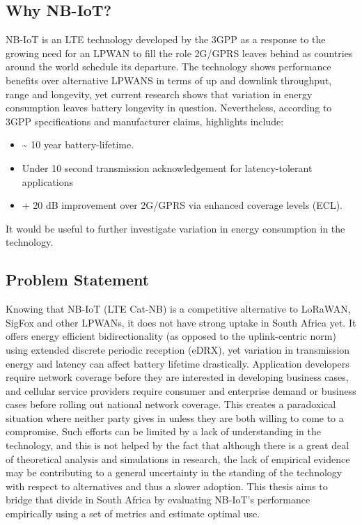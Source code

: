 \documentclass[]{article}
\providecommand{\tightlist}{%
  \setlength{\itemsep}{0pt}\setlength{\parskip}{0pt}}
\begin{document}
\hypertarget{why}{%
\subsection{Why NB-IoT?}\label{why}}

NB-IoT is an LTE technology developed by the 3GPP as a response to the
growing need for an LPWAN to fill the role 2G/GPRS leaves behind as
countries around the world schedule its departure. The technology shows
performance benefits over alternative LPWANS in terms of up and downlink
throughput, range and longevity, yet current research shows that
variation in energy consumption leaves battery longevity in question.
Nevertheless, according to 3GPP specifications and manufacturer claims,
highlights include:

\begin{itemize}
\tightlist
\item
  \textasciitilde{} 10 year battery-lifetime.
\item
  Under 10 second transmission acknowledgement for latency-tolerant
  applications
\item
  + 20 dB improvement over 2G/GPRS via enhanced coverage levels (ECL).
\end{itemize}

It would be useful to further investigate variation in energy
consumption in the technology.

\hypertarget{probstat}{%
\subsection{Problem Statement}\label{probstat}}

Knowing that NB-IoT (LTE Cat-NB) is a competitive alternative to
LoRaWAN, SigFox and other LPWANs, it does not have strong uptake in
South Africa yet. It offers energy efficient bidirectionality (as
opposed to the uplink-centric norm) using extended discrete periodic
reception (eDRX), yet variation in transmission energy and latency can
affect battery lifetime drastically. Application developers require
network coverage before they are interested in developing business
cases, and cellular service providers require consumer and enterprise
demand or business cases before rolling out national network coverage.
This creates a paradoxical situation where neither party gives in unless
they are both willing to come to a compromise. Such efforts can be
limited by a lack of understanding in the technology, and this is not
helped by the fact that although there is a great deal of theoretical
analysis and simulations in research, the lack of empirical evidence may
be contributing to a general uncertainty in the standing of the
technology with respect to alternatives and thus a slower adoption. This
thesis aims to bridge that divide in South Africa by evaluating NB-IoT's
performance empirically using a set of metrics and estimate optimal use.
\end{document}
